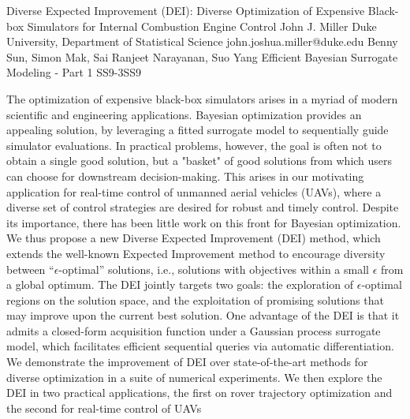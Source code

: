 \begin{talk}
  {Diverse Expected Improvement (DEI): Diverse Optimization of Expensive Black-box Simulators for Internal Combustion Engine Control}%
  {John J. Miller}%
  {Duke University, Department of Statistical Science}%
  {john.joshua.miller@duke.edu}%
  {Benny Sun, Simon Mak, Sai Ranjeet Narayanan, Suo Yang}%
{Efficient Bayesian Surrogate Modeling - Part 1}
{}{SS9-3}{SS9}

			
The optimization of expensive black-box simulators arises in a myriad of modern scientific and engineering applications. Bayesian optimization provides an appealing solution, by leveraging a fitted surrogate model to sequentially guide simulator evaluations. In practical problems, however, the goal is often not to obtain a single good solution, but a "basket" of good solutions from which users can choose for downstream decision-making. This arises in our motivating application for real-time control of unmanned aerial vehicles (UAVs), where a diverse set of control strategies are desired for robust and timely control. Despite its importance, there has been little work on this front for Bayesian optimization. We thus propose a new Diverse Expected Improvement (DEI) method, which extends the well-known Expected Improvement method to encourage diversity between ``$\epsilon$-optimal'' solutions, i.e., solutions with objectives within a small $\epsilon$ from a global optimum. The DEI jointly targets two goals: the exploration of $\epsilon$-optimal regions on the solution space, and the exploitation of promising solutions that may improve upon the current best solution. One advantage of the DEI is that it admits a closed-form acquisition function under a Gaussian process surrogate model, which facilitates efficient sequential queries via automatic differentiation. We demonstrate the improvement of DEI over state-of-the-art methods for diverse optimization in a suite of numerical experiments. We then explore the DEI in two practical applications, the first on rover trajectory optimization and the second for real-time control of UAVs



\end{talk}

